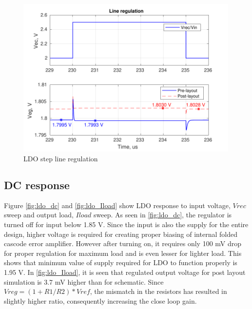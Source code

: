 \documentclass[12pt,a4paper,UKenglish]{report}
\begin{document}
\begin{figure}[H] %
   \centering
   \includegraphics[width=0.99\textwidth]{img/ldo_liner_both.pdf} 
   \caption{LDO step line regulation}
   \label{fig:ldo_liner}
\end{figure}

\subsection{DC response}		%

Figure \ref{fig:ldo_dc} and \ref{fig:ldo_Iload} show LDO response to input voltage, $Vrec$ sweep and output load, $Iload$ sweep. As seen in \ref{fig:ldo_dc}, the
regulator is turned off for input below 1.85 V. Since the input is also the supply for the entire design, higher voltage is required for creating proper biasing 
of internal folded cascode error amplifier. However after turning on, it requires only 100 mV drop for proper regulation for maximum load and is even lesser for lighter 
load. This shows that minimum value of supply required for LDO to function properly is 1.95 V. In \ref{fig:ldo_Iload}, it is seen that regulated output voltage for post 
layout simulation is 3.7 mV higher than for schematic. Since $Vreg = (1 + R1/R2)*Vref$, the mismatch in the resistors has resulted in slightly higher ratio, consequently 
increasing the close loop gain.\\
\end{document}
